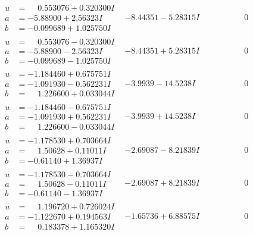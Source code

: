 \documentclass[1p]{elsarticle_modified}
\theoremstyle{definition}
\begin{document}
$$\begin{array}{c|c|c}
\begin{aligned}
u &= \phantom{-}0.553076 + 0.320300 I \\
a &= -5.88900 + 2.56323 I \\
b &= -0.099689 + 1.025750 I\end{aligned}
 & -8.44351 - 5.28315 I & \phantom{-0.000000 } 0 \\ \hline\begin{aligned}
u &= \phantom{-}0.553076 - 0.320300 I \\
a &= -5.88900 - 2.56323 I \\
b &= -0.099689 - 1.025750 I\end{aligned}
 & -8.44351 + 5.28315 I & \phantom{-0.000000 } 0 \\ \hline\begin{aligned}
u &= -1.184460 + 0.675751 I \\
a &= -1.091930 - 0.562231 I \\
b &= \phantom{-}1.226600 + 0.033044 I\end{aligned}
 & -3.9939 - 14.5238 I & \phantom{-0.000000 } 0 \\ \hline\begin{aligned}
u &= -1.184460 - 0.675751 I \\
a &= -1.091930 + 0.562231 I \\
b &= \phantom{-}1.226600 - 0.033044 I\end{aligned}
 & -3.9939 + 14.5238 I & \phantom{-0.000000 } 0 \\ \hline\begin{aligned}
u &= -1.178530 + 0.703664 I \\
a &= \phantom{-}1.50628 + 0.11011 I \\
b &= -0.61140 + 1.36937 I\end{aligned}
 & -2.69087 - 8.21839 I & \phantom{-0.000000 } 0 \\ \hline\begin{aligned}
u &= -1.178530 - 0.703664 I \\
a &= \phantom{-}1.50628 - 0.11011 I \\
b &= -0.61140 - 1.36937 I\end{aligned}
 & -2.69087 + 8.21839 I & \phantom{-0.000000 } 0 \\ \hline\begin{aligned}
u &= \phantom{-}1.196720 + 0.726024 I \\
a &= -1.122670 + 0.194563 I \\
b &= \phantom{-}0.183378 + 1.165320 I\end{aligned}
 & -1.65736 + 6.88575 I & \phantom{-0.000000 } 0\\

\end{array}$$
\end{document}
